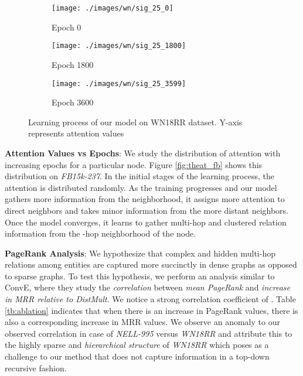\documentclass[11pt,a4paper]{article}
\begin{document}
\begin{figure*}[t]
  \centering
  \hspace{-1.9cm}
  \begin{subfigure}[b]{0.2\linewidth}\label{hwn:a}
    \texttt{[image: ./images/wn/sig\_25\_0]}
    \caption{Epoch 0}
  \end{subfigure}
  \hspace{2.1cm}
  \begin{subfigure}[b]{0.2\linewidth}\label{hwn:c}
    \texttt{[image: ./images/wn/sig\_25\_1800]}
    \caption{Epoch 1800}
  \end{subfigure}
  \hspace{2.1cm}
  \begin{subfigure}[b]{0.2\linewidth}\label{hwn:e}
    \texttt{[image: ./images/wn/sig\_25\_3599]}
    \caption{Epoch 3600}
  \end{subfigure}
  \caption{Learning process of our model on WN18RR dataset. Y-axis represents attention values  }
  \label{fig:theat_wn}
\end{figure*}

\noindent\textbf{Attention Values vs Epochs}: We study the distribution of attention with increasing epochs for a particular node. 
Figure \ref{fig:theat_fb} shows this distribution on \emph{FB15k-237}. In the initial stages of the learning process, the attention is distributed randomly. As the training progresses and our model gathers more information from the neighborhood, it assigns more attention to direct neighbors and takes minor information from the more distant neighbors. Once the model converges, it learns to gather multi-hop and clustered relation information from the -hop neighborhood of the node.

\noindent\textbf{PageRank Analysis}:
We hypothesize that complex and hidden multi-hop relations among entities are captured more succinctly in dense graphs as opposed to sparse graphs. 
To test this hypothesis, we perform an analysis similar to ConvE, where they study the \emph{correlation} between \emph{mean PageRank} and \emph{increase in MRR relative to DistMult}. 
We notice a strong correlation coefficient of 
. Table \ref{tb:ablation} indicates that when there is an increase in PageRank values, there is also a corresponding increase in MRR values.
We observe an anomaly to our observed correlation in case of \emph{NELL-995} versus \emph{WN18RR}
and attribute this to the highly sparse and \emph{hierarchical structure} of \emph{WN18RR} which poses as a challenge to our method that does not capture information in a top-down recursive fashion. 
\end{document}
